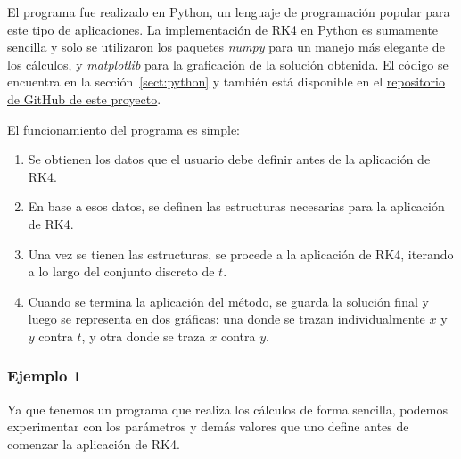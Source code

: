 El programa fue realizado en Python, un lenguaje de programación popular para este tipo de aplicaciones. La implementación de RK4 en Python es sumamente sencilla y solo se utilizaron los paquetes \textit{numpy} para un manejo más elegante de los cálculos, y \textit{matplotlib} para la graficación de la solución obtenida. El código se encuentra en la sección~\ref{sect:python} y también está disponible en el \href{https://github.com/camargomau/runge-kutta}{repositorio de GitHub de este proyecto}.

El funcionamiento del programa es simple:
\begin{enumerate}
    \item Se obtienen los datos que el usuario debe definir antes de la aplicación de RK4.
    \item En base a esos datos, se definen las estructuras necesarias para la aplicación de RK4.
    \item Una vez se tienen las estructuras, se procede a la aplicación de RK4, iterando a lo largo del conjunto discreto de \(t\).
    \item Cuando se termina la aplicación del método, se guarda la solución final y luego se representa en dos gráficas: una donde se trazan individualmente \(x\) y \(y\) contra \(t\), y otra donde se traza \(x\) contra \(y\).
\end{enumerate}

\subsubsection{Ejemplo 1}

Ya que tenemos un programa que realiza los cálculos de forma sencilla, podemos experimentar con los parámetros y demás valores que uno define antes de comenzar la aplicación de RK4.

